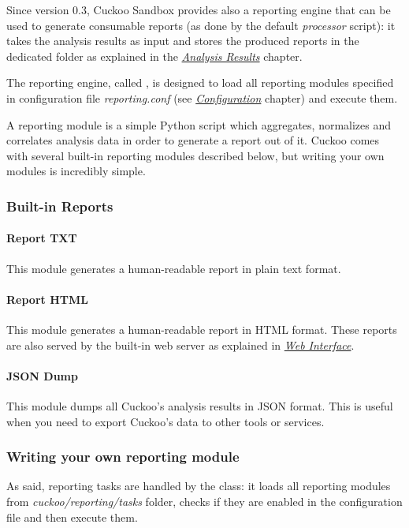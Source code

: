 \documentclass[letterpaper,10pt,english]{sphinxmanual}
\begin{document}
Since version 0.3, Cuckoo Sandbox provides also a reporting engine that can be used
to generate consumable reports (as done by the default \emph{processor} script): it takes
the analysis results as input and stores the produced reports in the dedicated folder
as explained in the {\hyperref[usage/results::doc]{\emph{Analysis Results}}} chapter.

The reporting engine, called , is designed to load all reporting modules
specified in configuration file \emph{reporting.conf} (see {\hyperref[installation/host/configuration::doc]{\emph{Configuration}}} chapter) and
execute them.

A reporting module is a simple Python script which aggregates, normalizes and correlates
analysis data in order to generate a report out of it. Cuckoo comes with several built-in
reporting modules described below, but writing your own modules is incredibly simple.


\subsubsection{Built-in Reports}
\label{customization/reporting:built-in-reports}

\paragraph{Report TXT}
\label{customization/reporting:report-txt}
This module generates a human-readable report in plain text format.


\paragraph{Report HTML}
\label{customization/reporting:report-html}
This module generates a human-readable report in HTML format. These reports are also
served by the built-in web server as explained in {\hyperref[usage/web::doc]{\emph{Web Interface}}}.


\paragraph{JSON Dump}
\label{customization/reporting:json-dump}
This module dumps all Cuckoo's analysis results in JSON format.
This is useful when you need to export Cuckoo's data to other tools or services.


\subsubsection{Writing your own reporting module}
\label{customization/reporting:writing-your-own-reporting-module}
As said, reporting tasks are handled by the  class: it loads all
reporting modules from \emph{cuckoo/reporting/tasks} folder, checks if they are enabled
in the configuration file and then execute them.
\end{document}
